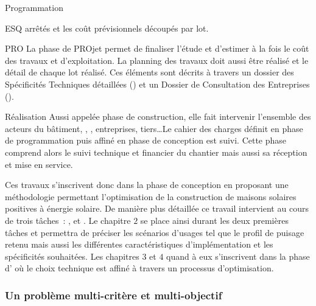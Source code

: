 \begin{blockdescription}{Programmation}
\begin{blockdescription}{ESQ}
                    arrêtés et les coût prévisionnels découpés par lot.
              \item [PRO] La phase de PROjet permet de finaliser l’étude et d’estimer
                     à la fois le coût des travaux et d’exploitation. La planning des travaux
                     doit aussi être réalisé et le détail de chaque lot réalisé. Ces éléments
                     sont décrits à travers un dossier des Spécificités Techniques
                     détaillées () et un Dossier de Consultation des Entreprises ().
          \end{blockdescription}
    \item[Réalisation] Aussi appelée phase de construction, elle fait intervenir l’ensemble des acteurs
          du bâtiment, , , entreprises, tiers\dots Le cahier des charges définit
          en phase de programmation puis affiné en phase de conception est suivi. Cette
          phase comprend alors le suivi technique et financier du chantier mais aussi sa
          réception et mise en service.
\end{blockdescription}

Ces travaux s’inscrivent donc dans la phase de conception en proposant une méthodologie
permettant l’optimisation de la construction de maisons solaires positives à énergie solaire.
De manière plus détaillée ce travail intervient au cours de trois tâches~: , 
et . Le chapitre $2$ se place ainsi durant les deux premières tâches
et permettra de préciser les scénarios d’usages tel que le profil de
puisage retenu mais aussi les différentes caractéristiques d’implémentation et les
spécificités souhaitées. Les chapitres $3$ et $4$ quand à eux s’inscrivent dans la phase
d’ où le choix technique est affiné à travers un processus d’optimisation.



\subsubsection{Un problème multi-critère et multi-objectif} %
\label{ssub:un_probleme_multi_critere_et_multi_objectif}

